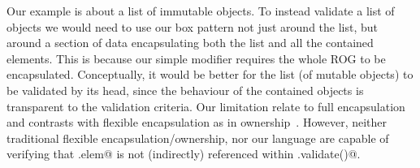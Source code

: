 Our example is about a list of immutable objects.
To instead validate a list of \Q@mut@ objects we would need to use our box pattern not just around the list,
but around a section of data encapsulating both the list and all the contained elements.
This is because our simple \Q@capsule@ modifier requires the whole ROG to be encapsulated.
Conceptually, it would be better for the list (of mutable objects) to be validated by its
head, since the behaviour of the contained objects is transparent to the validation criteria. 
Our limitation relate to full encapsulation and contrasts with flexible encapsulation as in 
ownership~\cite{ClarkeEtAl98}. However, neither traditional flexible encapsulation/ownership, nor our language are capable of verifying that \Q@List.elem@ is not (indirectly) referenced within \Q@ListBox.validate()@.

